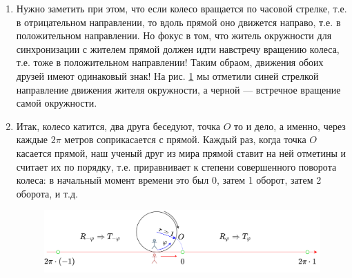 \begin{enumerate}
\item Нужно заметить при этом, что если колесо вращается по часовой стрелке, т.е. в отрицательном направлении, то вдоль прямой оно движется направо, т.е. в положительном направлении. Но фокус в том, что житель окружности для синхронизации с жителем прямой должен идти навстречу вращению колеса, т.е. тоже в положительном направлении! Таким обраом, движения обоих друзей имеют одинаковый знак! На рис. \ref{RundLine} мы отметили синей стрелкой направление движения жителя окружности, а черной --- встречное вращение самой окружности.
\item Итак, колесо катится, два друга беседуют, точка $O$ то и дело, а именно, через каждые $2\pi$ метров соприкасается с прямой. Каждый раз, когда точка $O$ касается прямой, наш ученый друг из мира прямой ставит на ней отметины и считает их по порядку, т.е. приравнивает к степени совершенного поворота колеса: в начальный момент времени это был 0, затем 1 оборот, затем 2 оборота, и т.д.

\begin{figure}[hbt!]
\begin{center}
\includegraphics[scale=0.2]{RundLine.png}
\end{center}
\caption{}\label{RundLine}
\end{figure}


\end{enumerate}
